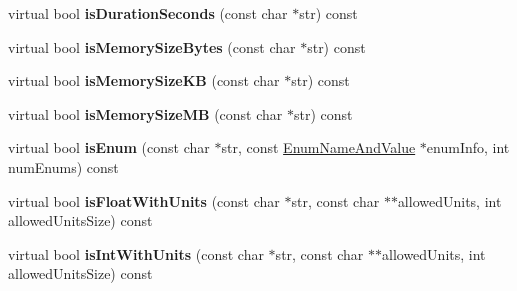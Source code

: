 \begin{DoxyCompactItemize}
\item 
\hypertarget{classCONFIG4CPP__NAMESPACE_1_1ConfigurationImpl_a30db55dba73c6c13a10ee8028b55fb6c}{virtual bool {\bfseries is\-Duration\-Seconds} (const char $\ast$str) const }\label{classCONFIG4CPP__NAMESPACE_1_1ConfigurationImpl_a30db55dba73c6c13a10ee8028b55fb6c}

\item 
\hypertarget{classCONFIG4CPP__NAMESPACE_1_1ConfigurationImpl_ad42d21874613853174976c47ab78a974}{virtual bool {\bfseries is\-Memory\-Size\-Bytes} (const char $\ast$str) const }\label{classCONFIG4CPP__NAMESPACE_1_1ConfigurationImpl_ad42d21874613853174976c47ab78a974}

\item 
\hypertarget{classCONFIG4CPP__NAMESPACE_1_1ConfigurationImpl_a7dfd7bb19a46bb250396ec9138cd06ff}{virtual bool {\bfseries is\-Memory\-Size\-K\-B} (const char $\ast$str) const }\label{classCONFIG4CPP__NAMESPACE_1_1ConfigurationImpl_a7dfd7bb19a46bb250396ec9138cd06ff}

\item 
\hypertarget{classCONFIG4CPP__NAMESPACE_1_1ConfigurationImpl_a9fd7bc33a12ba79dc856365ff3ce2f06}{virtual bool {\bfseries is\-Memory\-Size\-M\-B} (const char $\ast$str) const }\label{classCONFIG4CPP__NAMESPACE_1_1ConfigurationImpl_a9fd7bc33a12ba79dc856365ff3ce2f06}

\item 
\hypertarget{classCONFIG4CPP__NAMESPACE_1_1ConfigurationImpl_a60066845e8e23fecf673f69c8599622f}{virtual bool {\bfseries is\-Enum} (const char $\ast$str, const \hyperlink{structCONFIG4CPP__NAMESPACE_1_1EnumNameAndValue}{Enum\-Name\-And\-Value} $\ast$enum\-Info, int num\-Enums) const }\label{classCONFIG4CPP__NAMESPACE_1_1ConfigurationImpl_a60066845e8e23fecf673f69c8599622f}

\item 
\hypertarget{classCONFIG4CPP__NAMESPACE_1_1ConfigurationImpl_aaa9d0c40268e2f873cdcacf38773098c}{virtual bool {\bfseries is\-Float\-With\-Units} (const char $\ast$str, const char $\ast$$\ast$allowed\-Units, int allowed\-Units\-Size) const }\label{classCONFIG4CPP__NAMESPACE_1_1ConfigurationImpl_aaa9d0c40268e2f873cdcacf38773098c}

\item 
\hypertarget{classCONFIG4CPP__NAMESPACE_1_1ConfigurationImpl_a522f75217c642290e714135a1bd3e70f}{virtual bool {\bfseries is\-Int\-With\-Units} (const char $\ast$str, const char $\ast$$\ast$allowed\-Units, int allowed\-Units\-Size) const }\label{classCONFIG4CPP__NAMESPACE_1_1ConfigurationImpl_a522f75217c642290e714135a1bd3e70f}


\end{DoxyCompactItemize}
